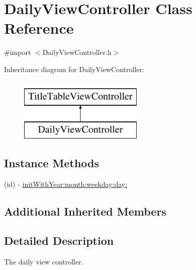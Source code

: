 \hypertarget{interface_daily_view_controller}{\section{Daily\+View\+Controller Class Reference}
\label{interface_daily_view_controller}
}


{\ttfamily \#import $<$Daily\+View\+Controller.\+h$>$}

Inheritance diagram for Daily\+View\+Controller\+:\begin{figure}[H]
\begin{center}
\leavevmode
\includegraphics[height=3.000000cm]{interface_daily_view_controller}
\end{center}
\end{figure}
\subsection*{Instance Methods}
\begin{DoxyCompactItemize}
\item 
(id) -\/ \hyperlink{interface_daily_view_controller_a878944aa1f745382d93c4dce2f22b431}{init\+With\+Year\+:month\+:weekday\+:day\+:}
\end{DoxyCompactItemize}
\subsection*{Additional Inherited Members}


\subsection{Detailed Description}
The daily view controller. 


